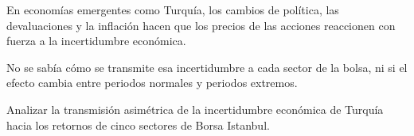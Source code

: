 \documentclass{article}
\newcommand{\bodysize}{\fontsize{30}{39.6}\selectfont}
\newcommand{\cardtitlesize}{\fontsize{35.4}{42.5}\selectfont}
\newcommand{\smallsize}{\fontsize{24.6}{32.0}\selectfont}
\newcommand{\cardtitle}[2][navy]{{\color{#1}\cardtitlesize\bfseries\textls[110]{\MakeUppercase{#2}}}\par\vspace{7mm}}
\begin{document}
\vfill
\hspace*{34mm}\begin{minipage}{773mm}
\begin{tcolorbox}[enhanced, sharp corners, colback=navy, boxrule=0pt, left=16mm, right=16mm, top=12mm, bottom=11mm,
  fontupper=\bodysize\raggedright, overlay={\fill[gold] (frame.north west) rectangle ([yshift=-5mm]frame.north east);}]
\begin{minipage}[t]{174.8mm}\raggedright{\color{acento}\smallsize\bfseries{}}\par{}\end{minipage}\hfill\begin{minipage}[t]{174.8mm}\raggedright{\color{acento}\smallsize\bfseries{}}\par{}\end{minipage}\hfill\begin{minipage}[t]{174.8mm}\raggedright{\color{acento}\smallsize\bfseries{}}\par{}\end{minipage}\hfill\begin{minipage}[t]{174.8mm}\raggedright{\color{acento}\smallsize\bfseries{}}\par{}\end{minipage}
\end{tcolorbox}
\end{minipage}

\vfill
\hspace*{34mm}\begin{minipage}{773mm}
\begin{tcbraster}[raster columns=3, raster equal height, raster column skip=16mm]
\begin{tcolorbox}[card]\cardtitle{Contexto}En economías emergentes como Turquía, los cambios de política, las devaluaciones y la inflación hacen que los precios de las acciones reaccionen con fuerza a la incertidumbre económica.\end{tcolorbox}
\begin{tcolorbox}[card]\cardtitle{Problema}No se sabía cómo se transmite esa incertidumbre a cada sector de la bolsa, ni si el efecto cambia entre periodos normales y periodos extremos.\end{tcolorbox}
\begin{tcolorbox}[card]\cardtitle{Objetivo}Analizar la transmisión asimétrica de la incertidumbre económica de Turquía hacia los retornos de cinco sectores de Borsa Istanbul.\end{tcolorbox}
\end{tcbraster}
\end{minipage}
\end{document}
